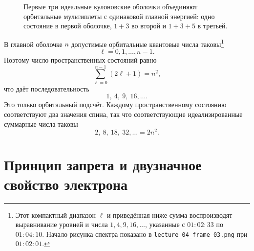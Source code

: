 \begin{figure}[htbp]
\centering
{}
\caption{Первые три идеальные кулоновские оболочки объединяют орбитальные мультиплеты с одинаковой главной энергией: одно состояние в первой оболочке, \(1+3\) во второй и \(1+3+5\) в третьей.}
\end{figure}

В главной оболочке \(n\) допустимые орбитальные квантовые числа таковы\footnote{Этот компактный диапазон \(\ell\) и приведённая ниже сумма воспроизводят выравнивание уровней и числа \(1,4,9,16,\ldots\), указанные с \(01{:}02{:}33\) по \(01{:}04{:}10\). Начало рисунка спектра показано в \texttt{lecture\_04\_frame\_03.png} при \(01{:}02{:}01\).}
\[
\ell=0,1,\ldots,n-1.
\]
Поэтому число пространственных состояний равно
\begin{equation}
\sum_{\ell=0}^{n-1}(2\ell+1)=n^{2},
\end{equation}
что даёт последовательность
\begin{equation}
1,\ 4,\ 9,\ 16,\ldots .
\end{equation}
Это только орбитальный подсчёт. Каждому пространственному состоянию соответствуют два значения спина, так что соответствующие идеализированные суммарные числа таковы
\begin{equation}
2,\ 8,\ 18,\ 32,\ldots=2n^{2}.
\end{equation}

\section{Принцип запрета и двузначное свойство электрона}

